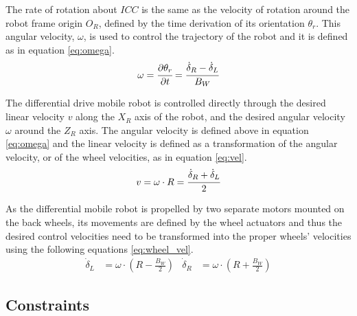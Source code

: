 The rate of rotation about $ICC$ is the same as the velocity of rotation around the robot frame origin $O_R$, defined by the time derivation of its orientation $\theta_r$. This angular velocity, $\omega$, is used to control the trajectory of the robot and it is defined as in equation \eqref{eq:omega}.
\begin{equation}
    \omega = \cfrac{\partial{\theta_r}}{\partial{t}} = \cfrac{\dot \delta_R - \dot \delta_L}{B_W}
    \label{eq:omega}
\end{equation}

The differential drive mobile robot is controlled directly through the desired linear velocity $v$ along the $X_R$ axis of the robot, and the desired angular velocity $\omega$ around the $Z_R$ axis.
The angular velocity is defined above in equation \eqref{eq:omega} and the linear velocity is defined as a transformation of the angular velocity, or of the wheel velocities, as in equation \eqref{eq:vel}.
\begin{equation}
    v = \omega \cdot R = \cfrac{\dot \delta_R + \dot \delta_L}{2}
    \label{eq:vel}
\end{equation}

As the differential mobile robot is propelled by two separate motors mounted on the back wheels, its movements are defined by the wheel actuators and thus the desired control velocities need to be transformed into the proper wheels' velocities using the following equations \eqref{eq:wheel_vel}.
\begin{align}
    \dot \delta _L  & =\omega \cdot ( R - \frac{B_W}{2} ) &
    \dot \delta _R  & = \omega \cdot ( R + \frac{B_W}{2})
    \label{eq:wheel_vel}
\end{align}


\subsection{Constraints}
\label{sec:constraints}

